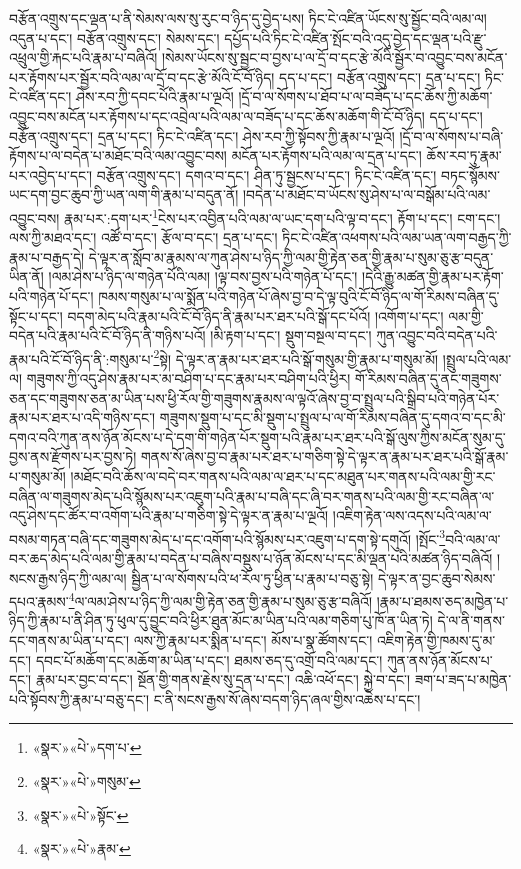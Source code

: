 བརྩོན་འགྲུས་དང་ལྡན་པ་ནི་སེམས་ལས་སུ་རུང་བ་ཉིད་དུ་བྱེད་པས། ཏིང་ངེ་འཛིན་ཡོངས་སུ་སྦྱོང་བའི་ལམ་ལ། འདུན་པ་དང་། བརྩོན་འགྲུས་དང་། སེམས་དང་། དཔྱོད་པའི་ཏིང་ངེ་འཛིན་སྤོང་བའི་འདུ་བྱེད་དང་ལྡན་པའི་རྫུ་འཕྲུལ་གྱི་རྐང་པའི་རྣམ་པ་བཞིའོ། །སེམས་ཡོངས་སུ་སྦྱང་བ་བྱས་པ་ལ་དྲོ་བ་དང་རྩེ་མོའི་སྦྱོར་བ་འབྱུང་བས་མངོན་པར་རྟོགས་པར་སྦྱོར་བའི་ལམ་ལ་དྲོ་བ་དང་རྩེ་མོའི་ངོ་བོ་ཉིད། དད་པ་དང་། བརྩོན་འགྲུས་དང་། དྲན་པ་དང་། ཏིང་ངེ་འཛིན་དང་། ཤེས་རབ་ཀྱི་དབང་པོའི་རྣམ་པ་ལྔའོ། །དྲོ་བ་ལ་སོགས་པ་ཐོབ་པ་ལ་བཟོད་པ་དང་ཆོས་ཀྱི་མཆོག་འབྱུང་བས་མངོན་པར་རྟོགས་པ་དང་འབྲེལ་པའི་ལམ་ལ་བཟོད་པ་དང་ཆོས་མཆོག་གི་ངོ་བོ་ཉིད། དད་པ་དང་། བརྩོན་འགྲུས་དང་། དྲན་པ་དང་། ཏིང་ངེ་འཛིན་དང་། ཤེས་རབ་ཀྱི་སྟོབས་ཀྱི་རྣམ་པ་ལྔའོ། །དྲོ་བ་ལ་སོགས་པ་བཞི་རྟོགས་པ་ལ་བདེན་པ་མཐོང་བའི་ལམ་འབྱུང་བས། མངོན་པར་རྟོགས་པའི་ལམ་ལ་དྲན་པ་དང་། ཆོས་རབ་ཏུ་རྣམ་པར་འབྱེད་པ་དང་། བརྩོན་འགྲུས་དང་། དགའ་བ་དང་། ཤིན་ཏུ་སྦྱངས་པ་དང་། ཏིང་ངེ་འཛིན་དང་། བཏང་སྙོམས་ཡང་དག་བྱང་ཆུབ་ཀྱི་ཡན་ལག་གི་རྣམ་པ་བདུན་ནོ། །བདེན་པ་མཐོང་བ་ཡོངས་སུ་ཤེས་པ་ལ་བསྒོམ་པའི་ལམ་འབྱུང་བས། རྣམ་པར་:དག་པར་\footnote{«སྣར་»«པེ་»དག་པ་}ངེས་པར་འབྱིན་པའི་ལམ་ལ་ཡང་དག་པའི་ལྟ་བ་དང་། རྟོག་པ་དང་། ངག་དང་། ལས་ཀྱི་མཐའ་དང་། འཚོ་བ་དང་། རྩོལ་བ་དང་། དྲན་པ་དང་། ཏིང་ངེ་འཛིན་འཕགས་པའི་ལམ་ཡན་ལག་བརྒྱད་ཀྱི་རྣམ་པ་བརྒྱད་དེ། དེ་ལྟར་ན་སློབ་མ་རྣམས་ལ་ཀུན་ཤེས་པ་ཉིད་ཀྱི་ལམ་གྱི་རྟེན་ཅན་གྱི་རྣམ་པ་སུམ་ཅུ་རྩ་བདུན་ཡིན་ནོ། །ལམ་ཤེས་པ་ཉིད་ལ་གཉེན་པོའི་ལམ། །ལྟ་བས་བྱས་པའི་གཉེན་པོ་དང་། །དེའི་རྒྱུ་མཚན་གྱི་རྣམ་པར་རྟོག་པའི་གཉེན་པོ་དང་། ཁམས་གསུམ་པ་ལ་སྨོན་པའི་གཉེན་པོ་ཞེས་བྱ་བ་དེ་ལྟ་བུའི་ངོ་བོ་ཉིད་ལ་གོ་རིམས་བཞིན་དུ་སྟོང་པ་དང་། བདག་མེད་པའི་རྣམ་པའི་ངོ་བོ་ཉིད་ནི་རྣམ་པར་ཐར་པའི་སྒོ་དང་པོའོ། །འགོག་པ་དང་། ལམ་གྱི་བདེན་པའི་རྣམ་པའི་ངོ་བོ་ཉིད་ནི་གཉིས་པའོ། །མི་རྟག་པ་དང་། སྡུག་བསྔལ་བ་དང་། ཀུན་འབྱུང་བའི་བདེན་པའི་རྣམ་པའི་ངོ་བོ་ཉིད་ནི་:གསུམ་པ་\footnote{«སྣར་»«པེ་»གསུམ་}སྟེ། དེ་ལྟར་ན་རྣམ་པར་ཐར་པའི་སྒོ་གསུམ་གྱི་རྣམ་པ་གསུམ་མོ། །སྤྲུལ་པའི་ལམ་ལ། གཟུགས་ཀྱི་འདུ་ཤེས་རྣམ་པར་མ་བཤིག་པ་དང་རྣམ་པར་བཤིག་པའི་ཕྱིར། གོ་རིམས་བཞིན་དུ་ནང་གཟུགས་ཅན་དང་གཟུགས་ཅན་མ་ཡིན་པས་ཕྱི་རོལ་གྱི་གཟུགས་རྣམས་ལ་ལྟའོ་ཞེས་བྱ་བ་སྤྲུལ་པའི་སྒྲིབ་པའི་གཉེན་པོར་རྣམ་པར་ཐར་པ་འདི་གཉིས་དང་། གཟུགས་སྡུག་པ་དང་མི་སྡུག་པ་སྤྲུལ་པ་ལ་གོ་རིམས་བཞིན་དུ་དགའ་བ་དང་མི་དགའ་བའི་ཀུན་ནས་ཉོན་མོངས་པ་དེ་དག་གི་གཉེན་པོར་སྡུག་པའི་རྣམ་པར་ཐར་པའི་སྒོ་ལུས་ཀྱིས་མངོན་སུམ་དུ་བྱས་ནས་རྫོགས་པར་བྱས་ཏེ། གནས་སོ་ཞེས་བྱ་བ་རྣམ་པར་ཐར་པ་གཅིག་སྟེ་དེ་ལྟར་ན་རྣམ་པར་ཐར་པའི་སྒོ་རྣམ་པ་གསུམ་མོ། །མཐོང་བའི་ཆོས་ལ་བདེ་བར་གནས་པའི་ལམ་ལ་ཐར་པ་དང་མཐུན་པར་གནས་པའི་ལམ་གྱི་རང་བཞིན་ལ་གཟུགས་མེད་པའི་སྙོམས་པར་འཇུག་པའི་རྣམ་པ་བཞི་དང་ཞི་བར་གནས་པའི་ལམ་གྱི་རང་བཞིན་ལ་འདུ་ཤེས་དང་ཚོར་བ་འགོག་པའི་རྣམ་པ་གཅིག་སྟེ་དེ་ལྟར་ན་རྣམ་པ་ལྔའོ། །འཇིག་རྟེན་ལས་འདས་པའི་ལམ་ལ་བསམ་གཏན་བཞི་དང་གཟུགས་མེད་པ་དང་འགོག་པའི་སྙོམས་པར་འཇུག་པ་དག་སྟེ་དགུའོ། །སྤོང་\footnote{«སྣར་»«པེ་»སྟོང་}བའི་ལམ་ལ་བར་ཆད་མེད་པའི་ལམ་གྱི་རྣམ་པ་བདེན་པ་བཞིས་བསྡུས་པ་ཉོན་མོངས་པ་དང་མི་ལྡན་པའི་མཚན་ཉིད་བཞིའོ། །སངས་རྒྱས་ཉིད་ཀྱི་ལམ་ལ། སྦྱིན་པ་ལ་སོགས་པའི་ཕ་རོལ་ཏུ་ཕྱིན་པ་རྣམ་པ་བཅུ་སྟེ། དེ་ལྟར་ན་བྱང་ཆུབ་སེམས་དཔའ་རྣམས་\footnote{«སྣར་»«པེ་»རྣམ་}ལ་ལམ་ཤེས་པ་ཉིད་ཀྱི་ལམ་གྱི་རྟེན་ཅན་གྱི་རྣམ་པ་སུམ་ཅུ་རྩ་བཞིའོ། །རྣམ་པ་ཐམས་ཅད་མཁྱེན་པ་ཉིད་ཀྱི་རྣམ་པ་ནི་ཤིན་ཏུ་ཕུལ་དུ་བྱུང་བའི་ཕྱིར་ཐུན་མོང་མ་ཡིན་པའི་ལམ་གཅིག་པུ་ཁོ་ན་ཡིན་ཏེ། དེ་ལ་ནི་གནས་དང་གནས་མ་ཡིན་པ་དང་། ལས་ཀྱི་རྣམ་པར་སྨིན་པ་དང་། མོས་པ་སྣ་ཚོགས་དང་། འཇིག་རྟེན་གྱི་ཁམས་དུ་མ་དང་། དབང་པོ་མཆོག་དང་མཆོག་མ་ཡིན་པ་དང་། ཐམས་ཅད་དུ་འགྲོ་བའི་ལམ་དང་། ཀུན་ནས་ཉོན་མོངས་པ་དང་། རྣམ་པར་བྱང་བ་དང་། སྔོན་གྱི་གནས་རྗེས་སུ་དྲན་པ་དང་། འཆི་འཕོ་དང་། སྐྱེ་བ་དང་། ཟག་པ་ཟད་པ་མཁྱེན་པའི་སྟོབས་ཀྱི་རྣམ་པ་བཅུ་དང་། ང་ནི་སངས་རྒྱས་སོ་ཞེས་བདག་ཉིད་ཞལ་གྱིས་འཆེས་པ་དང་། 
